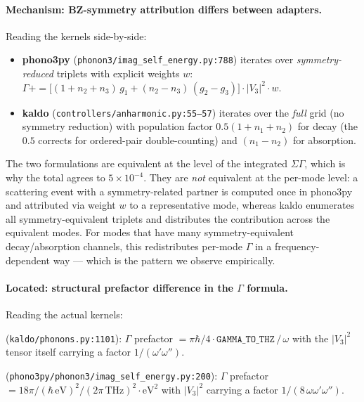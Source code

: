 \documentclass[11pt,a4paper]{article}
\begin{document}
\paragraph{Mechanism: BZ-symmetry attribution differs between adapters.} Reading the kernels
side-by-side:

\begin{itemize}[leftmargin=2em, itemsep=0.3em]
  \item \textbf{phono3py} (\texttt{phonon3/imag\_self\_energy.py:788}) iterates over
        \emph{symmetry-reduced} triplets with explicit weights $w$:
        $\Gamma \mathrel{{+}{=}} \big[(1+n_2+n_3)\,g_1 + (n_2-n_3)\,(g_2 - g_3)\big] \cdot |V_3|^2 \cdot w$.
  \item \textbf{kaldo} (\texttt{controllers/anharmonic.py:55--57}) iterates over the
        \emph{full} grid (no symmetry reduction) with population factor $0.5(1+n_1+n_2)$ for
        decay (the $0.5$ corrects for ordered-pair double-counting) and $(n_1-n_2)$ for
        absorption.
\end{itemize}

The two formulations are equivalent at the level of the integrated $\Sigma\Gamma$, which is why
the total agrees to $5\times 10^{-4}$. They are \emph{not} equivalent at the per-mode level: a
scattering event with a symmetry-related partner is computed once in phono3py and attributed via
weight $w$ to a representative mode, whereas kaldo enumerates all symmetry-equivalent triplets
and distributes the contribution across the equivalent modes. For modes that have many
symmetry-equivalent decay/absorption channels, this redistributes per-mode $\Gamma$ in a
frequency-dependent way --- which is the pattern we observe empirically.

\paragraph{Located: structural prefactor difference in the $\Gamma$ formula.} Reading the actual
kernels:

\begin{description}[leftmargin=2em, itemsep=0.4em]
  \item[kaldo] (\texttt{kaldo/phonons.py:1101}):
        $\Gamma$ prefactor $= \pi\hbar/4 \cdot \mathtt{GAMMA\_TO\_THZ}\,/\,\omega$ with the
        $|V_3|^2$ tensor itself carrying a factor $1/(\omega'\omega'')$.
  \item[phono3py] (\texttt{phono3py/phonon3/imag\_self\_energy.py:200}):
        $\Gamma$ prefactor $= 18\pi /(\hbar\,\mathrm{eV})^2 /(2\pi\,\mathrm{THz})^2 \cdot \mathrm{eV}^2$
        with $|V_3|^2$ carrying a factor $1/(8\,\omega\omega'\omega'')$.
\end{description}
\end{document}
